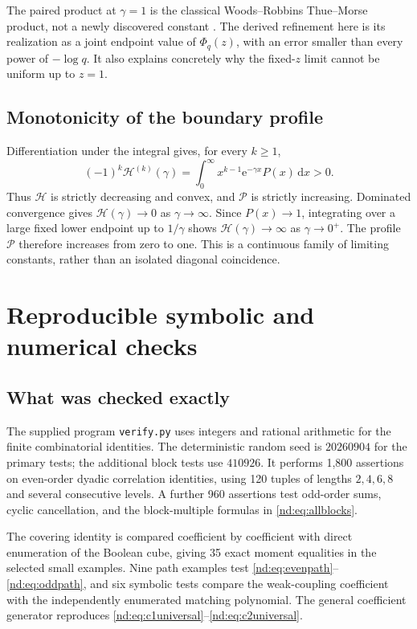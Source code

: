 \documentclass[11pt,a4paper,oneside,openany]{book}
\numberwithin{equation}{chapter}
\theoremstyle{definition}
\theoremstyle{remark}
\newcommand{\dd}{\,\mathrm d}
\newcommand{\e}{\mathrm e}
\begin{document}
The paired product at \(\gamma=1\) is the classical Woods--Robbins
Thue--Morse product, not a newly discovered constant \cite{ars,allouche-shallit}.
The derived refinement here is its realization as a joint endpoint value of
\(\Phi_q(z)\), with an error smaller than every power of \(-\log q\).
It also explains concretely why the fixed-\(z\) limit cannot be uniform up
to \(z=1\).

\section{Monotonicity of the boundary profile}
Differentiation under the integral gives, for every \(k\ge1\),
\begin{equation}
 (-1)^k\mathcal H^{(k)}(\gamma)
       =\int_0^\infty x^{k-1}\e^{-\gamma x}P(x)\dd x>0.
 \label{nd:eq:Hderivatives}
\end{equation}
Thus \(\mathcal H\) is strictly decreasing and convex, and
\(\mathcal P\) is strictly increasing. Dominated convergence gives
\(\mathcal H(\gamma)\to0\) as \(\gamma\to\infty\).
Since \(P(x)\to1\), integrating over a large fixed lower endpoint up to
\(1/\gamma\) shows \(\mathcal H(\gamma)\to\infty\) as \(\gamma\to0^+\).
The profile \(\mathcal P\) therefore increases from zero to one. This is a
continuous family of limiting constants, rather than an isolated diagonal
coincidence.
\chapter{Reproducible symbolic and numerical checks}
\label{nd:sec:experiments}

\section{What was checked exactly}
The supplied program \texttt{verify.py} uses integers and rational arithmetic
for the finite combinatorial identities. The deterministic random seed is
\(20260904\) for the primary tests; the additional block tests use
\(410926\). It performs 1,800 assertions on even-order dyadic correlation
identities, using 120 tuples of lengths \(2,4,6,8\) and several consecutive
levels. A further 960 assertions test odd-order sums, cyclic cancellation, and
the block-multiple formulas in \eqref{nd:eq:allblocks}.

The covering identity is compared coefficient by coefficient with direct
enumeration of the Boolean cube, giving 35 exact moment equalities in the
selected small examples. Nine path examples test
\eqref{nd:eq:evenpath}--\eqref{nd:eq:oddpath}, and six symbolic tests compare the
weak-coupling coefficient with the independently enumerated matching
polynomial. The general coefficient generator reproduces
\eqref{nd:eq:c1universal}--\eqref{nd:eq:c2universal}.
\end{document}
